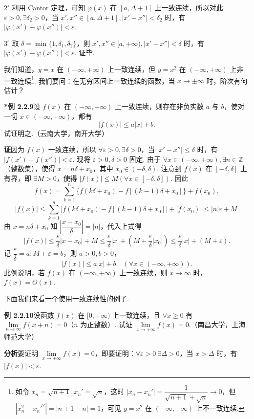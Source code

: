 \documentclass[UTF8, 12pt, fontset=fandol, oneside]{ctexart}
\begin{document}
$2^\circ$ 利用 Cantor 定理，可知 $\varphi(x)$ 在 $[a,\Delta+1]$ 上一致连续，所以对此 $\varepsilon>0,\exists\delta_2>0$，当 $x',x''\in[a,\Delta+1],|x'-x''|<\delta_2$ 时，有 $|\varphi(x')-\varphi(x'')|<\varepsilon$.

$3^\circ$ 取 $\delta=\min\{1,\delta_1,\delta_2\}$，则 $x',x''\in[a,+\infty),|x'-x''|<\delta$ 时，有 $|\varphi(x')-\varphi(x'')|<\varepsilon$. 证毕.

我们知道，$y=x$ 在 $(-\infty,+\infty)$ 上一致连续，但 $y=x^2$ 在 $(-\infty,+\infty)$ 上非一致连续\footnote{如令 $x_n=\sqrt{n+1},x_n'=\sqrt n$，这时 $|x_n-x_n'|=\dfrac1{\sqrt{n+1}+\sqrt n}\to0$，但 $|x_n^2-x_n'^2|=|n+1-n|=1$，可见 $y=x^2$ 在 $(-\infty,+\infty)$ 上不一致连续.}. 我们要问：在无穷区间上一致连续的函数，当 $x\to\pm\infty$ 时，阶次有何估计？

\noindent\textbf{*例 2.2.9}\quad 设 $f(x)$ 在 $(-\infty,+\infty)$ 上一致连续，则存在非负实数 $a$ 与 $b$，使对一切 $x\in(-\infty,+\infty)$，都有
\[
  |f(x)|\le a|x|+b.
\]
试证明之.（云南大学，南开大学）

\noindent\textbf{证}\quad 因为 $f(x)$ 一致连续，所以 $\forall\varepsilon>0,\exists\delta>0$，当 $|x'-x''|\le\delta$ 时，有 $|f(x')-f(x'')|<\varepsilon$. 现将 $\varepsilon>0,\delta>0$ 固定. 由于 $\forall x\in(-\infty,+\infty),\exists n\in\mathbb{Z}$（整数集），使得 $x=n\delta+x_0$，其中 $x_0\in(-\delta,\delta)$. 注意到 $f(x)$ 在 $[-\delta,\delta]$ 上有界，即 $\exists M>0$，使得 $|f(x)|\le M(\forall x\in[-\delta,\delta])$. 因此
\[
  f(x)=\sum_{k=1}^{n}\{f(k\delta+x_0)-f[(k-1)\delta+x_0]\}+f(x_0),
\]
\[
  |f(x)|\le\sum_{k=1}^{n}|f(k\delta+x_0)-f[(k-1)\delta+x_0]|+|f(x_0)|\le |n|\varepsilon+M.
\]
由 $x=n\delta+x_0$ 知 $\left|\dfrac{x-x_0}{\delta}\right|=|n|$，代入上式得
\[
  |f(x)|\le\frac\varepsilon\delta|x-x_0|+M\le\frac\varepsilon\delta|x|+\left(M+\frac\varepsilon\delta|x_0|\right)\le\frac\varepsilon\delta|x|+(M+\varepsilon).
\]
记 $\dfrac\varepsilon\delta=a,M+\varepsilon=b$，则 $a>0,b>0$，
\[
  |f(x)|\le a|x|+b\quad(\forall x\in(-\infty,+\infty)).
\]
此例说明，若 $f(x)$ 在 $(-\infty,+\infty)$ 上一致连续，则 $x\to\infty$ 时，$f(x)=O(x)$.

下面我们来看一个使用一致连续性的例子.

\noindent\textbf{例 2.2.10}\quad 设函数 $f(x)$ 在 $[0,+\infty)$ 上一致连续，且 $\forall x\ge0$ 有 $\lim\limits_{n\to\infty}f(x+n)=0$（$n$ 为正整数）. 试证 $\lim\limits_{x\to+\infty}f(x)=0$.（南昌大学，上海师范大学）

\noindent\textbf{分析}\quad 要证明 $\lim\limits_{x\to+\infty}f(x)=0$，即要证明：$\forall\varepsilon>0\ \exists\Delta>0$，当 $x>\Delta$ 时，有 $|f(x)|<\varepsilon$.
\end{document}
